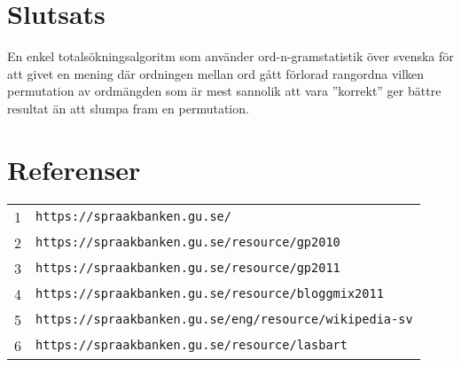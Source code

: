 \documentclass[a4paper,11pt]{article}
\begin{document}
\section*{Slutsats}
En enkel totalsökningsalgoritm som använder ord-n-gramstatistik över svenska för
att givet en mening där ordningen mellan ord gått förlorad rangordna vilken permutation
av ordmängden som är mest sannolik att vara ''korrekt'' ger bättre resultat än att slumpa
fram en permutation.

\section*{Referenser}

\begin{tabular}{r l}
1 & \small \texttt{https://spraakbanken.gu.se/}\\
2 & \small \texttt{https://spraakbanken.gu.se/resource/gp2010}\\
3 & \small \texttt{https://spraakbanken.gu.se/resource/gp2011}\\
4 & \small \texttt{https://spraakbanken.gu.se/resource/bloggmix2011}\\
5 & \small \texttt{https://spraakbanken.gu.se/eng/resource/wikipedia-sv}\\
6 & \small \texttt{https://spraakbanken.gu.se/resource/lasbart}\\
\end{tabular}
\end{document}
